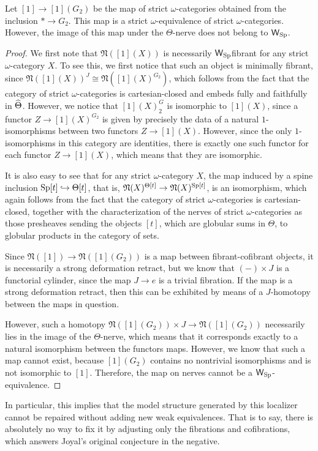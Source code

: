 \begin{thm} Let \([1]\to [1](G_2)\) be the map of strict \(\omega\)-categories obtained from the inclusion \(\ast \to G_2\).  This map is a strict \(\omega\)-equivalence of strict \(\omega\)-categories.  However, the image of this map under the \(\Theta\)-nerve does not belong to \(\mathsf{W}_{{\operatorname{Sp}}}\).
\end{thm}
\begin{proof}We first note that \(\mathfrak{N}([1](X))\) is necessarily \(\mathsf{W}_{{\operatorname{Sp}}}\)fibrant for any strict \(\omega\)-category \(X\).  To see this, we first notice that such an object is minimally fibrant, since \(\mathfrak{N}([1](X))^J\cong \mathfrak{N}([1](X)^{G_2})\), which follows from the fact that the category of strict \(\omega\)-categories is cartesian-closed and embeds fully and faithfully in \(\widehat{\Theta}\).  However, we notice that \([1](X)^G_2\) is isomorphic to \([1](X)\), since a functor \(Z\to [1](X)^{G_2}\) is given by precisely the data of a natural \(1\)-isomorphisms between two functors \(Z\to [1](X)\).  However, since the only \(1\)-isomorphisms in this category are identities, there is exactly one such functor for each functor \(Z\to [1](X)\), which means that they are isomorphic.  

It is also easy to see that for any strict \(\omega\)-category \(X\), the map induced by a spine inclusion \({\operatorname{Sp}}[t]\hookrightarrow \Theta[t]\), that is, \(\mathfrak{N}(X)^{\Theta[t]}\to \mathfrak{N}(X)^{{\operatorname{Sp}}[t]}\), is an isomorphism, which again follows from the fact that the category of strict \(\omega\)-categories is cartesian-closed, together with the characterization of the nerves of strict \(\omega\)-categories as those presheaves sending the objects \([t]\), which are globular sums in \(\Theta\), to globular products in the category of sets.  

Since \(\mathfrak{N}([1])\to \mathfrak{N}([1](G_2))\) is a map between fibrant-cofibrant objects, it is necessarily a strong deformation retract, but we know that \((-)\times J\) is a functorial cylinder, since the map \(J\to e\) is a trivial fibration.  If the map is a strong deformation retract, then this can be exhibited by means of a \(J\)-homotopy between the maps in question.

However, such a homotopy \(\mathfrak{N}([1](G_2))\times J \to \mathfrak{N}([1](G_2))\) necessarily lies in the image of the \(\Theta\)-nerve, which means that it corresponds exactly to a natural isomorphism between the functors maps.  However, we know that such a map cannot exist, because \([1](G_2)\) contains no nontrivial isomorphisms and is not isomorphic to \([1]\).  Therefore, the map on nerves cannot be a \(\mathsf{W}_{{\operatorname{Sp}}}\)-equivalence.
\end{proof}
In particular, this implies that the model structure generated by this localizer cannot be repaired without adding new weak equivalences.  That is to say, there is absolutely no way to fix it by adjusting only the fibrations and cofibrations, which answers Joyal's original conjecture in the negative.

